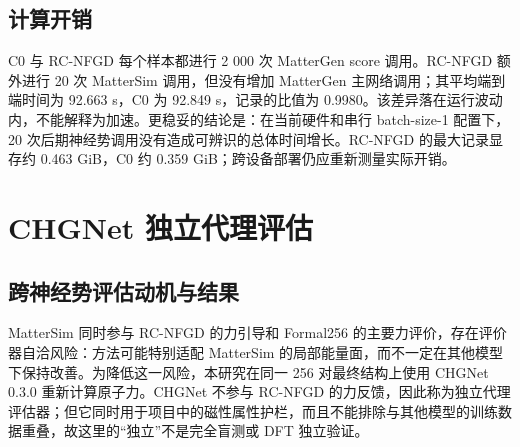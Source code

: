 \subsection{计算开销}

C0 与 RC-NFGD 每个样本都进行 2 000 次 MatterGen score 调用。RC-NFGD 额外进行 20 次 Matter\allowbreak Sim 调用，但没有增加 MatterGen 主网络调用；其平均端到端时间为 92.663 s，C0 为 92.849 s，记录的比值为 0.9980。该差异落在运行波动内，不能解释为加速。更稳妥的结论是：在当前硬件和串行 batch-size-1 配置下，20 次后期神经势调用没有造成可辨识的总体时间增长。RC-NFGD 的最大记录显存约 0.463 GiB，C0 约 0.359 GiB；跨设备部署仍应重新测量实际开销。

\section{CHGNet 独立代理评估}

\subsection{跨神经势评估动机与结果}

Matter\allowbreak Sim 同时参与 RC-NFGD 的力引导和 Formal256 的主要力评价，存在评价器自洽风险：方法可能特别适配 Matter\allowbreak Sim 的局部能量面，而不一定在其他模型下保持改善。为降低这一风险，本研究在同一 256 对最终结构上使用 CHGNet 0.3.0 重新计算原子力\citep{deng2023}。CHGNet 不参与 RC-NFGD 的力反馈，因此称为独立代理评估器；但它同时用于项目中的磁性属性护栏，而且不能排除与其他模型的训练数据重叠，故这里的``独立''不是完全盲测或 DFT 独立验证。


